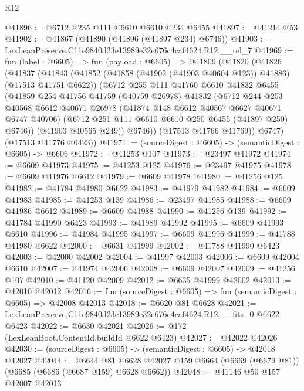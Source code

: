 \begin{lexlean}{R12}
\begin{coremodule}
@41896 := @6712 @235 @111 @6610 @6610 @234 @6455
@41897 := @41214 @53
@41902 := @41867 (@41890 (@41896 (@41897 @234) @6746))
@41903 := LexLeanPreserve.C11e9840d23e13989e32e676c4caf4624.R12.__rel_7
@41969 := fun (label : @6605) =>
  fun (payload : @6605) =>
  @41809
    (@41820
      (@41826
        (@41837
          (@41843
            (@41852 (@41858 (@41902 (@41903 @40604 @123)) @41886) (@17513 @41751 @6622))
            (@6712
              @255
              @111
              @41760
              @6610
              @41832
              @6455
              (@41859
                @254
                @41756
                @41759
                (@40759 @26978)
                @41832
                (@6712
                  @244
                  @253
                  @40568
                  @6612
                  @40671
                  @26978
                  (@41874 @148 @6612 @40567 @6627 @40671 @6747 @40706)
                  (@6712 @251 @111 @6610 @6610 @250 @6455 (@41897 @250) @6746))
                (@41903 @40565 @249))
              @6746))
          (@17513 @41766 @41769))
        @6747)
      (@17513 @41776 @6423))
@41971 := (sourceDigest : @6605) -> (semanticDigest : @6605) -> @6606
@41972 := @41253 @107
@41973 := @23497 @41972
@41974 := @6609 @41973
@41975 := @41253 @125
@41976 := @23497 @41975
@41978 := @6609 @41976 @6612
@41979 := @6609 @41978
@41980 := @41256 @125
@41982 := @41784 @41980 @6622
@41983 := @41979 @41982
@41984 := @6609 @41983
@41985 := @41253 @139
@41986 := @23497 @41985
@41988 := @6609 @41986 @6612
@41989 := @6609 @41988
@41990 := @41256 @139
@41992 := @41784 @41990 @6423
@41993 := @41989 @41992
@41995 := @6609 @41993 @6610
@41996 := @41984 @41995
@41997 := @6609 @41996
@41999 := @41788 @41980 @6622
@42000 := @6631 @41999
@42002 := @41788 @41990 @6423
@42003 := @42000 @42002
@42004 := @41997 @42003
@42006 := @6609 @42004 @6610
@42007 := @41974 @42006
@42008 := @6609 @42007
@42009 := @41256 @107
@42010 := @41120 @42009
@42012 := @6635 @41999 @42002
@42013 := @42010 @42012
@42016 := fun (sourceDigest : @6605) => fun (semanticDigest : @6605) => @42008 @42013
@42018 := @6620 @81 @6628
@42021 := LexLeanPreserve.C11e9840d23e13989e32e676c4caf4624.R12.__fits_0 @6622 @6423
@42022 := @6630 @42021
@42026 := @172 (LexLeanBoot.ContentId.buildId @6622 @6423)
@42027 := @42022 @42026
@42030 := (sourceDigest : @6605) -> (semanticDigest : @6605) -> @42018 @42027
@42044 := @6644
    @81
    @6628
    @42027
    @159
    @6664
    (@6669 (@6679 @81))
    (@6685 (@6686 (@6687 @159) @6628 @6662))
@42048 := @41146 @50 @157 @42007 @42013

\end{coremodule}
\end{lexlean}
